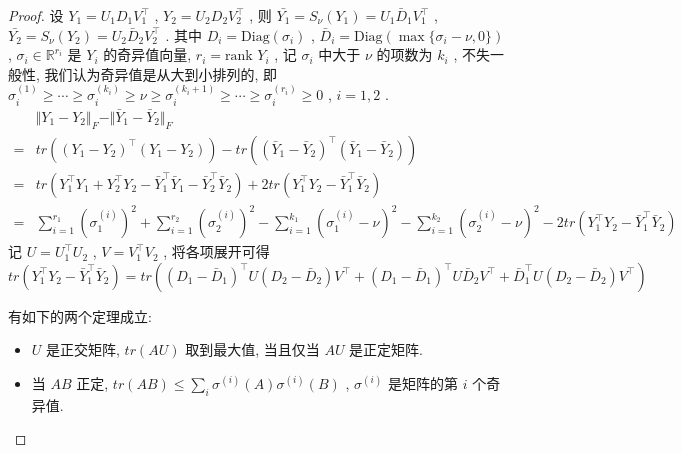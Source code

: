 \documentclass[a4paper, UTF8]{ctexart}				%
\numberwithin{equation}{section}				%
\newcommand{\upcite}[1]{\textsuperscript{\textsuperscript{\cite{#1}}}}
\begin{document}
				\begin{proof}\upcite{ma2011fixed}
					设 $Y_1 = U_1 D_1 V_1 ^\top$ , $Y_2 = U_2 D_2 V_2 ^\top$ , 则 $\bar{Y_1} = S_\nu(Y_1) = U_1 \bar{D}_1 V_1 ^\top$ , $\bar{Y_2} = S_\nu(Y_2) = U_2 \bar{D}_2 V_2 ^\top$ . 其中 $D_i = \text{Diag}(\sigma_i)$ , $\bar{D}_i = \text{Diag}(\max\{\sigma_i - \nu, 0\})$ , $\sigma_i \in \mathbb{R}^{r_i}$ 是 $Y_i$ 的奇异值向量, $r_i = \text{rank }Y_i$ , 记 $\sigma_i$ 中大于 $\nu$ 的项数为 $k_i$ , 不失一般性, 我们认为奇异值是从大到小排列的, 即 $\sigma_i^{(1)} \ge \cdots \ge \sigma_i^{(k_i)} \ge \nu \ge \sigma_i^{(k_i + 1)} \ge \cdots \ge \sigma_i^{(r_i)} \ge 0$ , $i = 1, 2$ .
					\begin{equation*}
						\begin{split}
								& \Vert{Y_1 - Y_2}\Vert_F - \Vert{\bar{Y}_1 - \bar{Y}_2}\Vert_F\\
							=	& tr((Y_1 - Y_2)^\top (Y_1 - Y_2)) - tr((\bar{Y}_1 - \bar{Y}_2)^\top (\bar{Y}_1 - \bar{Y}_2))\\
							=	& tr(Y_1^\top Y_1 + Y_2^\top Y_2 - \bar{Y}_1^\top \bar{Y}_1 - \bar{Y}_2^\top \bar{Y}_2) + 2tr(Y_1 ^\top Y_2 - \bar{Y}_1 ^\top \bar{Y}_2)\\
							=	& \sum^{r_1}_{i = 1}(\sigma_1^{(i)})^2 + \sum^{r_2}_{i = 1}(\sigma_2^{(i)})^2 - \sum^{k_1}_{i = 1}(\sigma_1^{(i)} - \nu)^2 - \sum^{k_2}_{i = 1}(\sigma_2^{(i)} - \nu)^2 - 2tr(Y_1 ^\top Y_2 - \bar{Y}_1 ^\top \bar{Y}_2)
						\end{split}
					\end{equation*}
					记 $U = U_1^\top U_2$ , $V =  V_1^\top V_2$ , 将各项展开可得 
					\begin{equation}\label{inProofSv}
						tr(Y_1 ^\top Y_2 - \bar{Y}_1 ^\top \bar{Y}_2) = 
						tr(	(D_1 - \bar{D}_1)^\top U (D_2 - \bar{D}_2)V ^\top
						+	(D_1 - \bar{D}_1)^\top U \bar{D}_2 V ^\top
						+	\bar{D}_1^\top U (D_2 - \bar{D}_2) V ^\top)
					\end{equation}
					
					有如下的两个定理成立:
					\begin{itemize}
						\item $U$ 是正交矩阵, $tr(AU)$ 取到最大值, 当且仅当 $AU$ 是正定矩阵.\upcite{horn2012matrix}
						\item 当 $AB$ 正定, $tr(AB) \le \sum^{ }_{i}\sigma^{(i)}(A)\sigma^{(i)}(B)$ , $\sigma^{(i)}$ 是矩阵的第 $i$ 个奇异值.\upcite{horn2012matrix}
					\end{itemize}


\end{proof}
\end{document}
